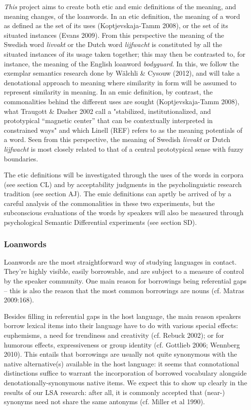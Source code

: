 \documentclass[a4paper]{article}
\begin{document}
\emph{This} project aims to create both etic and emic definitions of the meaning, and meaning changes, of the loanwords. In an etic definition, the meaning of a word as defined as the set of its uses (Koptjevskaja-Tamm 2008), or the set of its situated instances (Evans 2009). From this perspective the meaning of the Swedish word \emph{livvakt} or the Dutch word \emph{lijfwacht} is constituted by all the situated instances of its usage taken together; this may then be contrasted to, for instance, the meaning of the English loanword \emph{bodyguard}. In this, we follow the exemplar semantics research done by Wälchli \& Cysouw (2012), and will take a denotational approach to meaning where similarity in form will be assumed to represent similarity in meaning. In an emic definition, by contrast, the commonalities behind the different uses are sought (Koptjevskaja-Tamm 2008), what Traugott \& Dasher 2002 call a "stabilized, institutionalized, and prototypical “magnetic center” that can be contextually interpreted in constrained ways" and which Linell (REF) refers to as the meaning potentials of a word. Seen from this perspective, the meaning of Swedish \emph{livvakt} or Dutch \emph{lijfwacht} is most closely related to that of a central prototypical sense with fuzzy boundaries.

The etic definitions will be investigated through the uses of the words in corpora (see section CL) and by acceptability judgments in the psycholinguistic research tradition (see section AJ). The emic definitions can aprtly be arrived of by a careful analysis of the commonalities in these two experiments, but the subconscious evaluations of the words by speakers will also be measured through psychological Semantic Differential experiments (see section SD).




\subsubsection{Loanwords}
Loanwords are the most straightforward way of studying languages in contact. They're highly visible, easily borrowable, and are subject to a measure of control by the speaker community. One main reason for borrowings being referential gaps -- this is also the reason that the most common borrowings are nouns (cf. Matras 2009:168).

Besides filling in referential gaps in the host language, the main reason speakers borrow lexical items into their language have to do with various special effects: euphemisms, a need for trendiness and creativity (cf. Rebuck 2002); or for humorous effects, expressiveness or group identity (cf. Gottlieb 2006; Wennberg 2010). This entails that borrowings are usually not quite synonymous with the native alternative(s) available in the host language: it seems that connotational distinctions suffice to warrant the incorporation of borrowed vocabulary alongside denotationally-synonymous native items. We expect this to show up clearly in the results of our LSA research: after all, it is commonly accepted that (near-) synonyms need not share the same antonyms (cf. Miller et al 1990). 
\end{document}
